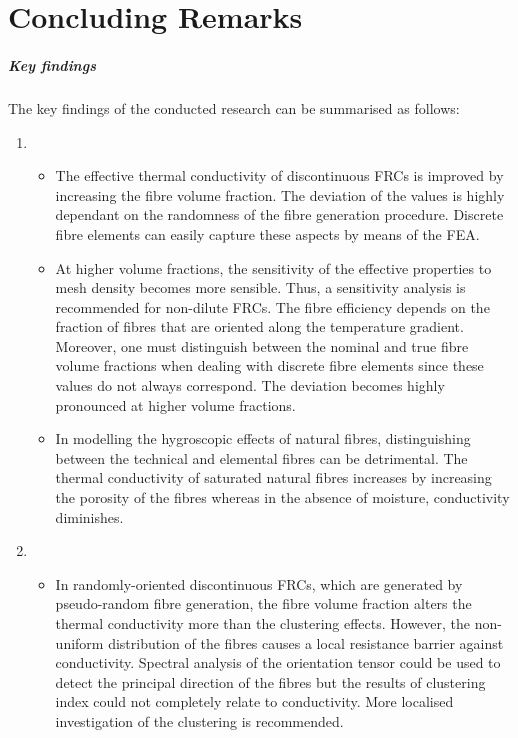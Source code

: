 
\chapter{Concluding Remarks}\label{chap:conc}

\paragraph{Key findings} The key findings of the conducted research can be summarised as follows:


\begin{enumerate}[label=Stage~\Roman*.]
	\item 
	\begin{itemize}
		\item The effective thermal conductivity of discontinuous FRCs is improved by increasing the fibre volume fraction. The deviation of the values is highly dependant on the randomness of the fibre generation procedure. Discrete fibre elements can easily capture these aspects by means of the FEA. 
		\item At higher volume fractions, the sensitivity of the effective properties to mesh density becomes more sensible. Thus, a sensitivity analysis is recommended for non-dilute FRCs. The fibre efficiency depends on the fraction of fibres that are oriented along the temperature gradient. Moreover, one must distinguish between the nominal and true fibre volume fractions when dealing with discrete fibre elements since these values do not always correspond. The deviation becomes highly pronounced at higher volume fractions.
		\item In modelling the hygroscopic effects of natural fibres, distinguishing between the technical and elemental fibres can be detrimental. The thermal conductivity of saturated natural fibres increases by increasing the porosity of the fibres whereas in the absence of moisture, conductivity diminishes.
	\end{itemize}
	\item 
	\begin{itemize}
		\item In randomly-oriented discontinuous FRCs, which are generated by pseudo-random fibre generation, the fibre volume fraction alters the thermal conductivity more than the clustering effects. However, the non-uniform distribution of the fibres causes a local resistance barrier against conductivity. Spectral analysis of the orientation tensor could be used to detect the principal direction of the fibres but the results of clustering index could not completely relate to conductivity. More localised investigation of the clustering is recommended.

\end{itemize}
\end{enumerate}
